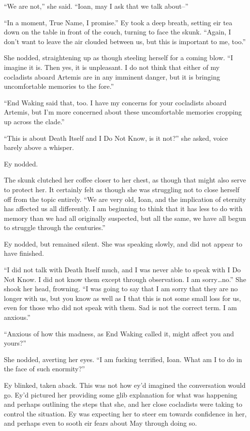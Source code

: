 ``We are not,'' she said. ``Ioan, may I ask that we talk about--''

``In a moment, True Name, I promise.'' Ey took a deep breath, setting eir tea down on the table in front of the couch, turning to face the skunk. ``Again, I don't want to leave the air clouded between us, but this is important to me, too.''

She nodded, straightening up as though steeling herself for a coming blow. ``I imagine it is. Then yes, it is unpleasant. I do not think that either of my cocladists aboard Artemis are in any imminent danger, but it is bringing uncomfortable memories to the fore.''

``End Waking said that, too. I have my concerns for your cocladists aboard Artemis, but I'm more concerned about these uncomfortable memories cropping up across the clade.''

``This is about Death Itself and I Do Not Know, is it not?'' she asked, voice barely above a whisper.

Ey nodded.

The skunk clutched her coffee closer to her chest, as though that might also serve to protect her. It certainly felt as though she was struggling not to close herself off from the topic entirely. ``We are very old, Ioan, and the implication of eternity has affected us all differently. I am beginning to think that it has less to do with memory than we had all originally suspected, but all the same, we have all begun to struggle through the centuries.''

Ey nodded, but remained silent. She was speaking slowly, and did not appear to have finished.

``I did not talk with Death Itself much, and I was never able to speak with I Do Not Know. I did not know them except through observation. I am sorry\ldots no.'' She shook her head, frowning. ``I was going to say that I am sorry that they are no longer with us, but you know as well as I that this is not some small loss for us, even for those who did not speak with them. Sad is not the correct term. I am anxious.''

``Anxious of how this madness, as End Waking called it, might affect you and yours?''

She nodded, averting her eyes. ``I am fucking terrified, Ioan. What am I to do in the face of such enormity?''

Ey blinked, taken aback. This was not how ey'd imagined the conversation would go. Ey'd pictured her providing some glib explanation for what was happening and perhaps outlining the steps that she, and her close cocladists were taking to control the situation. Ey was expecting her to steer em towards confidence in her, and perhaps even to sooth eir fears about May through doing so.

